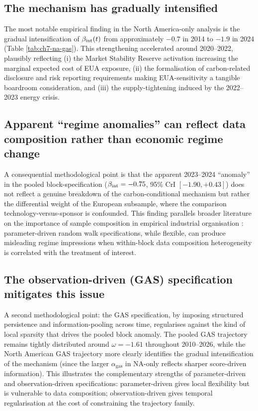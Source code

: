 \subsection{The mechanism has gradually intensified}

The most notable empirical finding in the North America-only analysis is the gradual intensification of $\beta_{\mathrm{int}}(t)$ from approximately $-0.7$ in 2014 to $-1.9$ in 2024 (Table \ref{tab:ch7-na-gas}). This strengthening accelerated around 2020--2022, plausibly reflecting (i) the Market Stability Reserve activation increasing the marginal expected cost of EUA exposure, (ii) the formalisation of carbon-related disclosure and risk reporting requirements making EUA-sensitivity a tangible boardroom consideration, and (iii) the supply-tightening induced by the 2022--2023 energy crisis.

\subsection{Apparent ``regime anomalies'' can reflect data composition rather than economic regime change}

A consequential methodological point is that the apparent 2023--2024 ``anomaly'' in the pooled block-specification ($\beta_{\mathrm{int}} = -0.75$, 95\% CrI $[-1.90, +0.43]$) does not reflect a genuine breakdown of the carbon-conditional mechanism but rather the differential weight of the European subsample, where the comparison technology-versus-sponsor is confounded. This finding parallels broader literature on the importance of sample composition in empirical industrial organisation \cite{durbin2012time}: parameter-driven random walk specifications, while flexible, can produce misleading regime impressions when within-block data composition heterogeneity is correlated with the treatment of interest.

\subsection{The observation-driven (GAS) specification mitigates this issue}

A second methodological point: the GAS specification, by imposing structured persistence and information-pooling across time, regularises against the kind of local sparsity that drives the pooled block anomaly. The pooled GAS trajectory remains tightly distributed around $\omega = -1.61$ throughout 2010--2026, while the North American GAS trajectory more clearly identifies the gradual intensification of the mechanism (since the larger $\alpha_{\mathrm{gas}}$ in NA-only reflects sharper score-driven information). This illustrates the complementary strengths of parameter-driven and observation-driven specifications: parameter-driven gives local flexibility but is vulnerable to data composition; observation-driven gives temporal regularisation at the cost of constraining the trajectory family.

